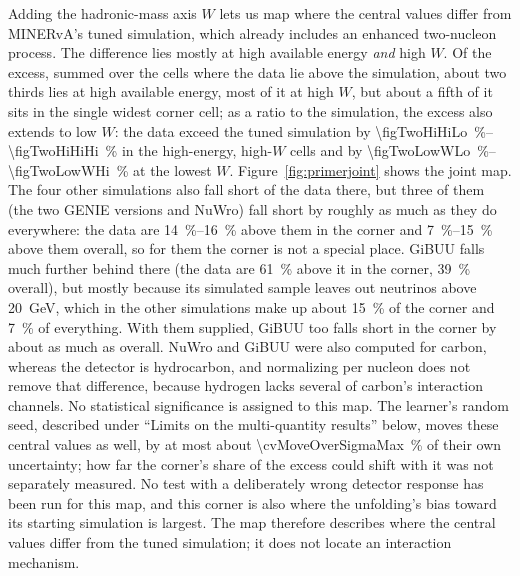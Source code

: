 Adding the hadronic-mass axis $W$ lets us map where the central values differ from MINERvA's tuned simulation, which already includes an enhanced two-nucleon process. The difference lies mostly at high available energy \emph{and} high $W$. Of the excess, summed over the cells where the data lie above the simulation, about two thirds lies at high available energy, most of it at high $W$, but about a fifth of it sits in the single widest corner cell; as a ratio to the simulation, the excess also extends to low $W$: the data exceed the tuned simulation by \SIrange{\figTwoHiHiLo}{\figTwoHiHiHi}{\percent} in the high-energy, high-$W$ cells and by \SIrange{\figTwoLowWLo}{\figTwoLowWHi}{\percent} at the lowest $W$. Figure~\ref{fig:primerjoint} shows the joint map. The four other simulations also fall short of the data there, but three of them (the two GENIE versions and NuWro) fall short by roughly as much as they do everywhere: the data are \SIrange{14}{16}{\percent} above them in the corner and \SIrange{7}{15}{\percent} above them overall, so for them the corner is not a special place. GiBUU falls much further behind there (the data are \SI{61}{\percent} above it in the corner, \SI{39}{\percent} overall), but mostly because its simulated sample leaves out neutrinos above \SI{20}{GeV}, which in the other simulations make up about \SI{15}{\percent} of the corner and \SI{7}{\percent} of everything. With them supplied, GiBUU too falls short in the corner by about as much as overall. NuWro and GiBUU were also computed for carbon, whereas the detector is hydrocarbon, and normalizing per nucleon does not remove that difference, because hydrogen lacks several of carbon's interaction channels. No statistical significance is assigned to this map. The learner's random seed, described under ``Limits on the multi-quantity results'' below, moves these central values as well, by at most about \SI[round-mode=places,round-precision=0]{\cvMoveOverSigmaMax}{\percent} of their own uncertainty; how far the corner's share of the excess could shift with it was not separately measured. No test with a deliberately wrong detector response has been run for this map, and this corner is also where the unfolding's bias toward its starting simulation is largest. The map therefore describes where the central values differ from the tuned simulation; it does not locate an interaction mechanism.
